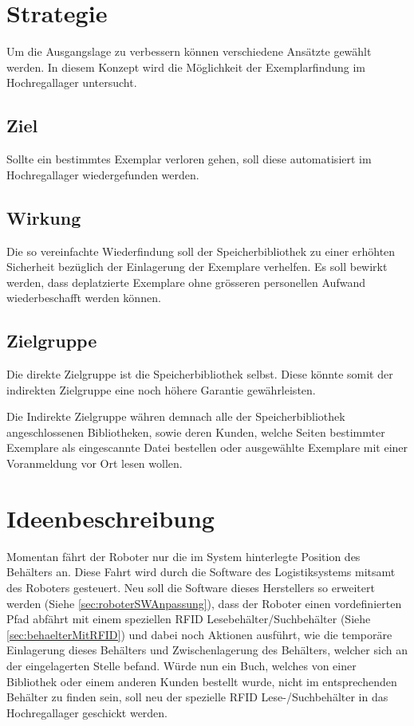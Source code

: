 \section{Strategie}
Um die Ausgangslage zu verbessern können verschiedene Ansätzte gewählt werden. In diesem Konzept wird die Möglichkeit der Exemplarfindung im Hochregallager untersucht.

\subsection{Ziel}
Sollte ein bestimmtes Exemplar verloren gehen, soll diese automatisiert im Hochregallager wiedergefunden werden.

\subsection{Wirkung}
Die so vereinfachte Wiederfindung soll der Speicherbibliothek zu einer erhöhten Sicherheit bezüglich der Einlagerung der Exemplare verhelfen. Es soll bewirkt werden, dass deplatzierte Exemplare ohne grösseren personellen Aufwand wiederbeschafft werden können.

\subsection{Zielgruppe}
Die direkte Zielgruppe ist die Speicherbibliothek selbst. Diese könnte somit der indirekten Zielgruppe eine noch höhere Garantie gewährleisten.

Die Indirekte Zielgruppe währen demnach alle der Speicherbibliothek angeschlossenen Bibliotheken, sowie deren Kunden, welche Seiten bestimmter Exemplare als eingescannte Datei bestellen oder ausgewählte Exemplare mit einer Voranmeldung vor Ort lesen wollen.

\section{Ideenbeschreibung}
Momentan fährt der Roboter nur die im System hinterlegte Position des Behälters an. Diese Fahrt wird durch die Software des Logistiksystems mitsamt des Roboters gesteuert. Neu soll die Software dieses Herstellers so erweitert werden (Siehe \ref{sec:roboterSWAnpassung}), dass der Roboter einen vordefinierten Pfad abfährt mit einem speziellen RFID Lesebehälter/Suchbehälter (Siehe \ref{sec:behaelterMitRFID}) und dabei noch Aktionen ausführt, wie die temporäre Einlagerung dieses Behälters und Zwischenlagerung des Behälters, welcher sich an der eingelagerten Stelle befand.
Würde nun ein Buch, welches von einer Bibliothek oder einem anderen Kunden bestellt wurde, nicht im entsprechenden Behälter zu finden sein, soll neu der spezielle RFID Lese-/Suchbehälter in das Hochregallager geschickt werden.


